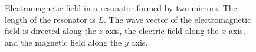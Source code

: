 \begin{figure}
\centering



\caption{Electromagnetic field in a resonator formed by two mirrors. The length of the resonator is $L$. The wave vector of the electromagnetic field is directed along the $z$ axis, the electric field along the $x$ axis, and the magnetic field along the $y$ axis.}
\label{figCh1_Res}
\end{figure}